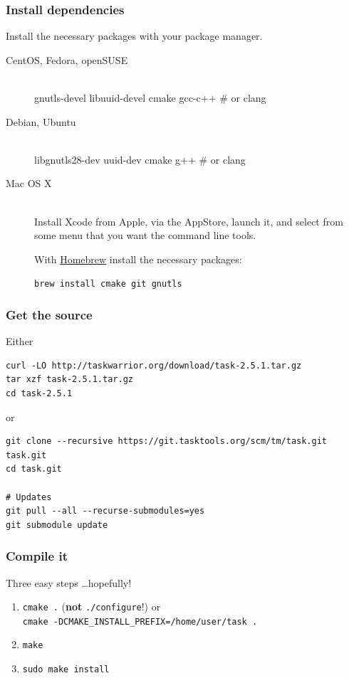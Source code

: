 \documentclass[t,handout]{beamer}
\begin{document}
\begin{frame}[fragile]\frametitle{Install dependencies}
    Install the necessary packages with your package manager.

    \begin{description}
        \item[CentOS, Fedora, openSUSE] \hfill \\
            gnutls-devel libuuid-devel cmake gcc-c++ \# or clang
        \item[Debian, Ubuntu] \hfill \\
            libgnutls28-dev uuid-dev cmake g++ \# or clang
        \item[Mac OS X] \hfill \\
            Install Xcode from Apple, via the AppStore, launch it, and select from some menu that you want the command line tools.

            With \href{http://brew.sh/}{Homebrew} install the necessary packages:

            \verb=brew install cmake git gnutls=
    \end{description}

\end{frame}

\begin{frame}[fragile]\frametitle{Get the source}
    \vfill
    Either

    \begin{lstlisting}
curl -LO http://taskwarrior.org/download/task-2.5.1.tar.gz
tar xzf task-2.5.1.tar.gz
cd task-2.5.1\end{lstlisting} \pause

    or

    \begin{lstlisting}
git clone --recursive https://git.tasktools.org/scm/tm/task.git task.git
cd task.git

# Updates
git pull --all --recurse-submodules=yes
git submodule update\end{lstlisting}
\end{frame}

\begin{frame}[fragile]\frametitle{Compile it}
    \vfill
    Three easy steps \ldots hopefully! \pause
    \begin{enumerate}
        \item \verb=cmake .= (\textbf{not} \verb=./configure=!) or \\
              \verb+cmake -DCMAKE_INSTALL_PREFIX=/home/user/task .+ \pause
        \item \verb=make= \pause
        \item \verb=sudo make install=
    \end{enumerate}
\end{frame}
\end{document}
